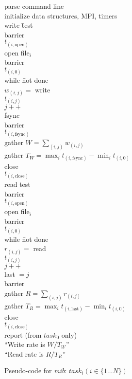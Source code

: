 \documentclass{article}
\begin{document}
\begin{figure}
\begin{tabbing}
parse command line \\
initialize data structures, MPI, timers \\
write \= test \\
  \> barrier \\
  \> $t_{(i, \mbox{open})}$ \\
  \> open file$_i$\\
  \> barrier \\
  \> $t_{(i, 0)}$ \\
  \> while \= not done \\
  \>  \>  $w_{(i, j)} = $ write \\
  \>  \>  $t_{(i, j)}$ \\
  \>  \>  $j++$ \\
  \> fsync \\
  \> barrier \\
  \> $t_{(i, \mbox{fsync})}$ \\
  \> gather $W = \sum_{(i, j)} w_{(i, j)}$ \\
  \> gather $T_W = \max_i t_{(i, \mbox{fsync})} - \min_i t_{(i, 0)}$ \\ 
  \> close \\
  \> $t_{(i, \mbox{close})}$ \\
read test \\
  \> barrier \\
  \> $t_{(i, \mbox{open})}$ \\
  \> open file$_i$\\
  \> barrier \\
  \> $t_{(i, 0)}$ \\
  \> while \= not done \\
  \>  \>  $r_{(i, j)} = $ read \\
  \>  \>  $t_{(i, j)}$ \\
  \>  \>  $j++$ \\
  \> last $= j$ \\
  \> barrier \\
  \> gather $R = \sum_{(i, j)} r_{(i, j)}$ \\
  \> gather $T_R = \max_i t_{(i, \mbox{last})} - \min_i t_{(i, 0)}$ \\ 
  \> close \\
  \> $t_{(i, \mbox{close})}$ \\
report (from $task_0$ only) \\
  \> ``Write rate is $W/T_W$'' \\
  \> ``Read rate is $R/T_R$'' \\
\end{tabbing}
\caption{Pseudo-code for {\em mib}: $task_i (i \in \{1 \ldots N\})$}
\label{figure.pseudo}
\end{figure}
\end{document}
